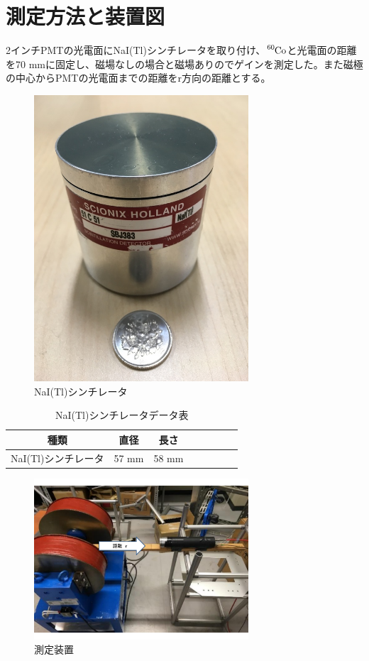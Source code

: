\section{測定方法と装置図}
2インチPMTの光電面にNaI(Tl)シンチレータを取り付け、$\ce{^{60}Co}$と光電面の距離を70 mmに固定し、磁場なしの場合と磁場ありのでゲインを測定した。また磁極の中心からPMTの光電面までの距離をr方向の距離とする。

\begin{figure}[htb]
	\centering
		\includegraphics[width=8cm]{fig/iguchi/NaIscinti.jpg}
	\caption{NaI(Tl)シンチレータ}
	\label{NaIscinti}
\end{figure}

\begin{table}[htb]
	\begin{center}
	
	  \begin{tabular}{|c|c|c|c|c|c|c|c|} \hline
		種類& 直径 & 長さ  \\ \hline \hline
		NaI(Tl)シンチレータ & 57 mm & 58 mm \\ \hline
	\end{tabular}
	  \caption{NaI(Tl)シンチレータデータ表}
	\end{center}
\end{table}

\begin{figure}[H]
	\centering
		\includegraphics[width=8cm]{fig/iguchi/2inchsokutei.pdf}
	\caption{測定装置}
	\label{2inchsokutei}
\end{figure}

